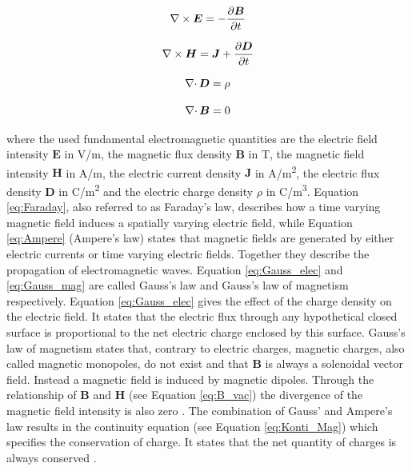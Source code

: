\begin{equation}
\label{eq:Faraday}
\centering
\nabla\times\boldsymbol{E} = -\frac{\partial\boldsymbol{B}}{\partial t}
\end{equation}

\begin{equation}
\label{eq:Ampere}
\centering
\nabla\times\boldsymbol{H} = \boldsymbol{J} + \frac{\partial\boldsymbol{D}}{\partial t}
\end{equation}

\begin{equation}
\label{eq:Gauss_elec}
\centering
\nabla\cdotp\boldsymbol{D} = \rho 
\end{equation}

\begin{equation}
\label{eq:Gauss_mag}
\centering
\nabla\cdotp\boldsymbol{B} = 0
\end{equation}

where the used fundamental electromagnetic quantities are the electric field intensity $\boldsymbol{E}$ in V/m, the magnetic flux density $\boldsymbol{B}$ in T, the magnetic field intensity $\boldsymbol{H}$ in A/m, the electric current density $\boldsymbol{J}$ in A/m\textsuperscript{2}, the electric flux density $\boldsymbol{D}$ in C/m\textsuperscript{2} and the electric charge density $\rho$ in C/m\textsuperscript{3}. Equation \ref{eq:Faraday}, also referred to as Faraday's law, describes how a time varying magnetic field induces a spatially varying electric field, while Equation \ref{eq:Ampere} (Ampere's law) states that magnetic fields are generated by either electric currents or time varying electric fields. Together they describe the propagation of electromagnetic waves. Equation \ref{eq:Gauss_elec} and \ref{eq:Gauss_mag} are called Gauss's law and Gauss's law of magnetism respectively. Equation \ref{eq:Gauss_elec} gives the effect of the charge density on the electric field. It states that the electric flux through any hypothetical closed surface is proportional to the net electric charge enclosed by this surface. Gauss's law of magnetism states that, contrary to electric charges, magnetic charges, also called magnetic monopoles, do not exist and that $\boldsymbol{B}$ is always a solenoidal vector field. Instead a magnetic field is induced by magnetic dipoles. Through the relationship of $\boldsymbol{B}$ and $\boldsymbol{H}$ (see Equation \ref{eq:B_vac}) the divergence of the magnetic field intensity is also zero \cite{monk2003finite} \cite{kallenbach2018elektromagnete}.
The combination of Gauss' and Ampere's law results in the continuity equation (see Equation \ref{eq:Konti_Mag}) which specifies the conservation of charge. It states that the net quantity of charges is always conserved \cite{monk2003finite}.   

